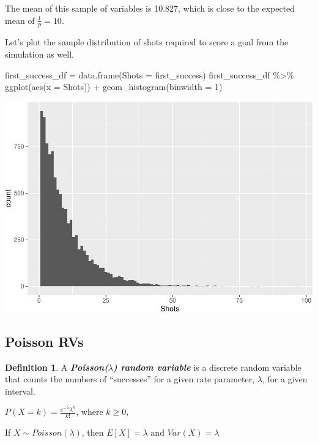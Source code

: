 \documentclass[
  11pt,
]{book}
\newenvironment{Shaded}{\begin{snugshade}}{\end{snugshade}}
\newcommand{\AttributeTok}[1]{\textcolor[rgb]{0.77,0.63,0.00}{#1}}
\newcommand{\DecValTok}[1]{\textcolor[rgb]{0.00,0.00,0.81}{#1}}
\newcommand{\FunctionTok}[1]{\textcolor[rgb]{0.00,0.00,0.00}{#1}}
\newcommand{\NormalTok}[1]{#1}
\newcommand{\OtherTok}[1]{\textcolor[rgb]{0.56,0.35,0.01}{#1}}
\newcommand{\SpecialCharTok}[1]{\textcolor[rgb]{0.00,0.00,0.00}{#1}}
\theoremstyle{definition}
\newtheorem{definition}{Definition}[chapter]
\theoremstyle{definition}
\theoremstyle{definition}
\theoremstyle{definition}
\theoremstyle{remark}
\begin{document}
The mean of this sample of variables is 10.827, which is close to the expected mean of \(\frac{1}{p} = 10\).

Let's plot the sample distribution of shots required to score a goal from the simulation as well.

\begin{Shaded}
\begin{Highlighting}[]
\NormalTok{first\_success\_df }\OtherTok{=} \FunctionTok{data.frame}\NormalTok{(}\AttributeTok{Shots =}\NormalTok{ first\_success)}
\NormalTok{first\_success\_df }\SpecialCharTok{\%\textgreater{}\%}
    \FunctionTok{ggplot}\NormalTok{(}\FunctionTok{aes}\NormalTok{(}\AttributeTok{x =}\NormalTok{ Shots)) }\SpecialCharTok{+} \FunctionTok{geom\_histogram}\NormalTok{(}\AttributeTok{binwidth =} \DecValTok{1}\NormalTok{)}
\end{Highlighting}
\end{Shaded}

\includegraphics{series_files/figure-latex/unnamed-chunk-50-1.pdf}

\newpage

\hypertarget{poisson-rvs}{%
\subsection{Poisson RVs}\label{poisson-rvs}}

\begin{definition}
A \textbf{\emph{Poisson(\(\lambda\)) random variable}} is a discrete random variable that counts the numbers of ``successes'' for a given rate parameter, \(\lambda\), for a given interval.

\(P(X=k) = \frac{e^{-\lambda}\lambda^k}{k!}\), where \(k \geq 0,\)

If \(X \sim Poisson(\lambda)\), then \(E[X]=\lambda\) and \(Var(X)=\lambda\)
\end{definition}
\end{document}
